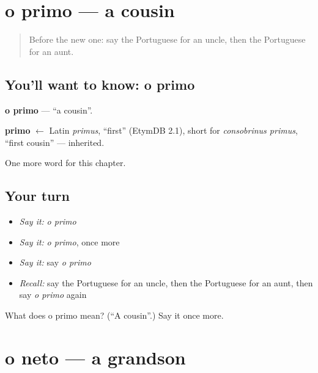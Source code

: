 \section[o primo]{o primo — a cousin}

\label{lesson:PT-C38-primo}



\begin{quote}
Before the new one: say the Portuguese for an uncle, then the Portuguese for an aunt.
\end{quote}

\subsection*{You'll want to know: o primo}
\textbf{o primo} — \textquotedblleft{}a cousin\textquotedblright{}.

\begin{cousinweb}
\textbf{primo} $\leftarrow$ Latin \emph{primus}, \textquotedblleft{}first\textquotedblright{} (EtymDB 2.1), short for \emph{consobrinus primus}, \textquotedblleft{}first cousin\textquotedblright{} — inherited.
\end{cousinweb}

\begin{grammarlens}[title={What you've built}]
One more word for this chapter.
\end{grammarlens}

\subsection*{Your turn}
\begin{itemize}
\raggedright
  \item \emph{Say it:} \emph{o primo}
  \item \emph{Say it:} \emph{o primo}, once more
  \item \emph{Say it:} say \emph{o primo}
  \item \emph{Recall:} say the Portuguese for an uncle, then the Portuguese for an aunt, then say \emph{o primo} again
\end{itemize}

\begin{tcolorbox}[breakable,colback=teal!4,colframe=teal!35!black,title={Before you move on}]
What does o primo mean? (\textquotedblleft{}A cousin\textquotedblright{}.) Say it once more.
\end{tcolorbox}
\section[o neto]{o neto — a grandson}

